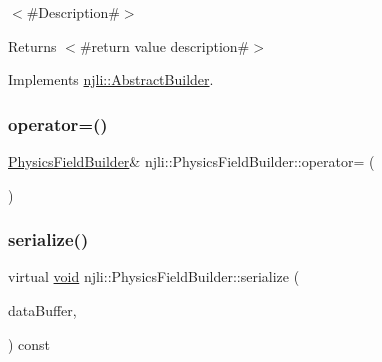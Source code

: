 $<$\#\+Description\#$>$

\begin{DoxyReturn}{Returns}
$<$\#return value description\#$>$ 
\end{DoxyReturn}


Implements \mbox{\hyperlink{classnjli_1_1_abstract_builder_a3e6e553e06d1ca30517ad5fb0bd4d000}{njli\+::\+Abstract\+Builder}}.

\mbox{\label{classnjli_1_1_physics_field_builder_a5878f42248d40f6756cad0d1a5d691fd}} 
\subsubsection{\texorpdfstring{operator=()}{operator=()}}
{\footnotesize\ttfamily \mbox{\hyperlink{classnjli_1_1_physics_field_builder}{Physics\+Field\+Builder}}\& njli\+::\+Physics\+Field\+Builder\+::operator= (\begin{DoxyParamCaption}\item[{const \mbox{\hyperlink{classnjli_1_1_physics_field_builder}{Physics\+Field\+Builder}} \&}]{ }\end{DoxyParamCaption})\hspace{0.3cm}{\ttfamily [protected]}}

\mbox{\label{classnjli_1_1_physics_field_builder_a71f853a857bc30b68444f69b9bc9936d}} 
\subsubsection{\texorpdfstring{serialize()}{serialize()}}
{\footnotesize\ttfamily virtual \mbox{\hyperlink{_thread_8h_af1e856da2e658414cb2456cb6f7ebc66}{void}} njli\+::\+Physics\+Field\+Builder\+::serialize (\begin{DoxyParamCaption}\item[{\mbox{\hyperlink{_thread_8h_af1e856da2e658414cb2456cb6f7ebc66}{void}} $\ast$}]{data\+Buffer,  }\item[{bt\+Serializer $\ast$}]{ }\end{DoxyParamCaption}) const\hspace{0.3cm}{\ttfamily [virtual]}}



